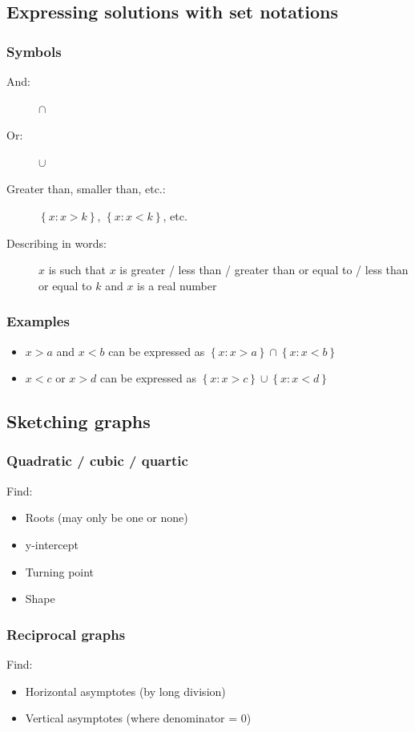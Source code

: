 \documentclass[A4paper]{article}
\begin{document}
	\subsection{Expressing solutions with set notations}
	\subsubsection{Symbols}
	\begin{description}
		\item[And:] $\cap$
		\item[Or:] $\cup$
		\item[Greater than, smaller than, etc.:] $\left\lbrace x:x>k\right\rbrace$, $\left\lbrace x:x<k\right\rbrace$, etc.
		\item[Describing in words:] $x$ is such that $x$ is greater / less than / greater than or equal to / less than or equal to $k$ and $x$ is a real number
	\end{description}
	\subsubsection{Examples}
	\begin{itemize}
		\item $x>a$ and $x<b$ can be expressed as $\left\lbrace x : x>a \right\rbrace \cap \left\lbrace x:x<b\right\rbrace$
		\item $x<c$ or $x>d$ can be expressed as $\left\lbrace x : x>c \right\rbrace \cup \left\lbrace x:x<d\right\rbrace$
	\end{itemize}

	\subsection{Sketching graphs}
	\subsubsection{Quadratic / cubic / quartic}
	Find:
	\begin{itemize}
		\item Roots (may only be one or none)
		\item y-intercept
		\item Turning point
		\item Shape
	\end{itemize}

	\subsubsection{Reciprocal graphs}
	Find:
	\begin{itemize}
		\item Horizontal asymptotes (by long division)
		\item Vertical asymptotes (where denominator = $0$)
	\end{itemize}
\end{document}
